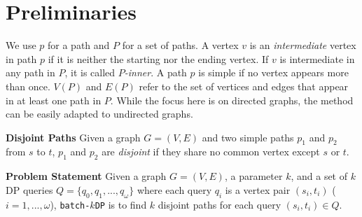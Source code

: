 \section{Preliminaries}\label{sec:problemdef}

We use $p$ for a path and $P$ for a set of paths.
A vertex $v$ is an \emph{intermediate} vertex in path $p$ if it is neither the starting nor the ending vertex. If $v$ is intermediate in any path in $P$, it is called \emph{$P$-inner}.
A path $p$ is simple if no vertex appears more than once.
$V(P)$ and $E(P)$ refer to the set of vertices and edges that appear in at least one path in $P$.
While the focus here is on directed graphs, the method can be easily adapted to undirected graphs.

\textbf{Disjoint Paths}
Given a graph $G = (V, E)$ and two simple paths $p_1$ and $p_2$ from $s$ to $t$, $p_1$ and $p_2$ are \emph{disjoint} if they share no common vertex except $s$ or $t$.

\textbf{Problem Statement}
Given a graph $G = (V, E)$, a parameter $k$, and a set of $k$DP queries $Q = \{q_0, q_1, ..., q_{\omega}\}$ where each query $q_i$ is a vertex pair $(s_i, t_i)$ ($i = 1, ..., \omega$), 
\texttt{batch-$k$DP} is to find $k$ disjoint paths for each query $(s_i, t_i) \in Q$.


